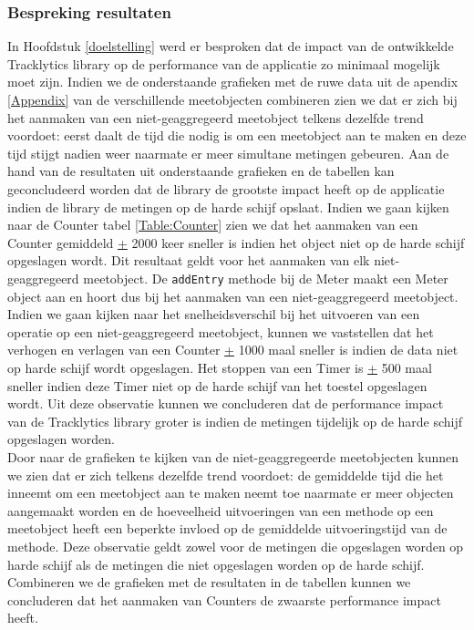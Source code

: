 \subsubsection{Bespreking resultaten}
In Hoofdstuk \ref{doelstelling} werd er besproken dat de impact van de ontwikkelde Tracklytics library op de performance van de applicatie zo minimaal mogelijk moet zijn. Indien we de onderstaande grafieken met de ruwe data uit de apendix \ref{Appendix} van de verschillende meetobjecten combineren zien we dat er zich bij het aanmaken van een niet-geaggregeerd meetobject telkens dezelfde trend voordoet: eerst daalt de tijd die nodig is om een meetobject aan te maken en deze tijd stijgt nadien weer naarmate er meer simultane metingen gebeuren. Aan de hand van de resultaten uit onderstaande grafieken en de tabellen kan geconcludeerd worden dat de library de grootste impact heeft op de applicatie indien de library de metingen op de harde schijf opslaat. Indien we gaan kijken naar de Counter tabel \ref{Table:Counter} zien we dat het aanmaken van een Counter gemiddeld \underline{+} 2000 keer sneller is indien het object niet op de harde schijf opgeslagen wordt. Dit resultaat geldt voor het aanmaken van elk niet-geaggregeerd meetobject. De \texttt{addEntry} methode bij de Meter maakt een Meter object aan en hoort dus bij het aanmaken van een niet-geaggregeerd meetobject. Indien we gaan kijken naar het snelheidsverschil bij het uitvoeren van een operatie op een niet-geaggregeerd meetobject, kunnen we vaststellen dat het verhogen en verlagen van een Counter \underline{+} 1000 maal sneller is indien de data niet op harde schijf wordt opgeslagen. Het stoppen van een Timer is \underline{+} 500 maal sneller indien deze Timer niet op de harde schijf van het toestel opgeslagen wordt. Uit deze observatie kunnen we concluderen dat de performance impact van de Tracklytics library groter is indien de metingen tijdelijk op de harde schijf opgeslagen worden. \\

Door naar de grafieken te kijken van de niet-geaggregeerde meetobjecten kunnen we zien dat er zich telkens dezelfde trend voordoet: de gemiddelde tijd die het inneemt om een meetobject aan te maken neemt toe naarmate er meer objecten aangemaakt worden en de hoeveelheid uitvoeringen van een methode op een meetobject heeft een beperkte invloed op de gemiddelde uitvoeringstijd van de methode. Deze observatie geldt zowel voor de metingen die opgeslagen worden op harde schijf als de metingen die niet opgeslagen worden op de harde schijf. Combineren we de grafieken met de resultaten in de tabellen kunnen we concluderen dat het aanmaken van Counters de zwaarste performance impact heeft. \\

